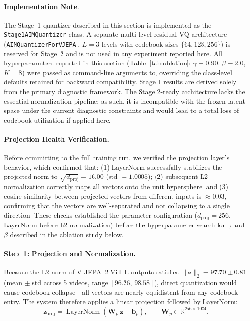 \documentclass{article}
\begin{document}
\paragraph{Implementation Note.}
The Stage~1 quantizer described in this section is implemented as the
\texttt{Stage1AIMQuantizer} class.
A separate multi-level residual VQ architecture (\texttt{AIMQuantizerForVJEPA}
, $L = 3$ levels with codebook sizes
$\{64, 128, 256\}$) is reserved for Stage~2 and is not used in any
experiment reported here.  All hyperparameters reported in this section
(Table~\ref{tab:ablation}: $\gamma = 0.90$, $\beta = 2.0$, $K = 8$)
were passed as command-line arguments to,
overriding the class-level defaults retained for backward compatibility.
Stage 1 results are derived solely from the primary diagnostic framework. The Stage 2-ready architecture lacks the essential normalization pipeline; as such, it is incompatible with the frozen latent space under the current diagnostic constraints and would lead to a total loss of codebook utilization if applied here.

\paragraph{Projection Health Verification.}
Before committing to the full training run, we verified the
projection layer's behavior,
which confirmed that: (1) LayerNorm successfully stabilizes the
projected norm to $\sqrt{d_{\text{proj}}} = 16.00$ (std $= 1.0005$);
(2) subsequent L2 normalization correctly maps all vectors onto the
unit hypersphere; and (3) cosine similarity between projected vectors
from different inputs is $\approx 0.03$, confirming that the vectors
are well-separated and not collapsing to a single direction.  These checks established the parameter configuration ($d_{\text{proj}} = 256$,
LayerNorm before L2 normalization) before the hyperparameter search for
$\gamma$ and $\beta$ described in the ablation study below.


 
\paragraph{Step~1: Projection and Normalization.}
Because the L2 norm of V-JEPA~2 ViT-L outputs satisfies
$\|\mathbf{z}\|_2 = 97.70 \pm 0.81$ (mean $\pm$ std across 5 videos,
range $[96.26,\,98.58]$), direct quantization would cause codebook
collapse---all vectors are nearly equidistant from any codebook entry.
The system therefore applies a linear projection followed by
LayerNorm:
%
\begin{equation}
  \mathbf{z}_{\text{proj}}
  = \operatorname{LayerNorm}(\mathbf{W}_p\,\mathbf{z} + \mathbf{b}_p),
  \qquad \mathbf{W}_p \in \mathbb{R}^{256 \times 1024}.
\end{equation}
%
\end{document}
